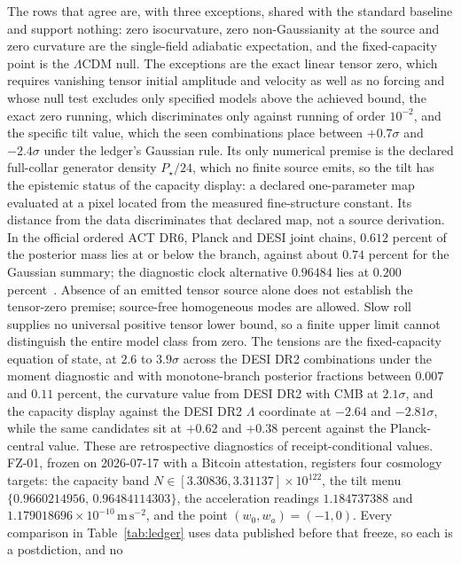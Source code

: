 \documentclass[11pt]{article}
\begin{document}
The rows that agree are, with three exceptions, shared with the standard
baseline and support nothing: zero isocurvature, zero non-Gaussianity at the
source and zero curvature are the single-field adiabatic expectation, and the
fixed-capacity point is the \(\Lambda\)CDM null. The exceptions are the exact
linear tensor zero, which requires vanishing tensor initial amplitude and
velocity as well as no forcing and whose null test excludes only specified
models above the achieved bound, the exact zero
running, which discriminates only against running of order \(10^{-2}\), and
the specific tilt value, which the seen combinations place between
\(+0.7\sigma\) and \(-2.4\sigma\) under the ledger's Gaussian rule. Its only
numerical premise is the declared full-collar generator density
\(P_\star/24\), which no finite source emits, so the tilt has the epistemic
status of the capacity display: a declared one-parameter map evaluated at a
pixel located from the measured fine-structure constant. Its distance from
the data discriminates that declared map, not a source derivation. In the
official ordered ACT DR6, Planck and DESI joint chains, \(0.612\) percent of
the posterior mass lies at or below the branch, against about \(0.74\)
percent for the Gaussian summary; the diagnostic clock alternative
\(0.96484\) lies at \(0.200\) percent~\cite{act2025,ophpublicdata}. Absence of an emitted tensor source alone
does not establish the tensor-zero premise; source-free homogeneous modes
are allowed. Slow roll supplies no universal positive tensor lower bound,
so a finite upper limit cannot distinguish the entire model class from zero.
The tensions are the fixed-capacity
equation of state, at \(2.6\) to \(3.9\sigma\) across the DESI DR2
combinations under the moment diagnostic and with monotone-branch posterior
fractions between \(0.007\) and \(0.11\) percent, the curvature value from
DESI DR2 with CMB at \(2.1\sigma\), and the capacity display against the
DESI DR2 \(\Lambda\) coordinate at \(-2.64\) and \(-2.81\sigma\), while the
same candidates sit at \(+0.62\) and \(+0.38\) percent against the
Planck-central value. These are retrospective
diagnostics of receipt-conditional values. FZ-01, frozen on 2026-07-17 with
a Bitcoin attestation, registers four cosmology targets: the capacity band
\(N\in[3.30836,3.31137]\times10^{122}\), the tilt menu
\(\{0.9660214956,\,0.96484114303\}\), the acceleration readings
\(1.184737388\) and \(1.179018696\times10^{-10}\,\mathrm{m\,s^{-2}}\), and
the point \((w_0,w_a)=(-1,0)\). Every comparison in Table~\ref{tab:ledger}
uses data published before that freeze, so each is a postdiction, and no
\end{document}
